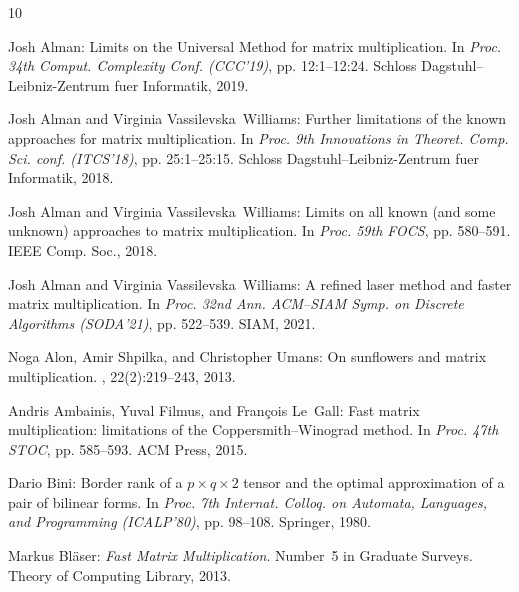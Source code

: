 \documentclass[11pt]{article}
\numberwithin{equation}{section}
\theoremstyle{definition}
\theoremstyle{plain}
\theoremstyle{definition}
\begin{document}
\tocrefpdfbookmark
\begin{thebibliography}{10}

{\sc Josh Alman}: Limits on the {U}niversal {M}ethod for matrix multiplication.
\newblock In {\em Proc. 34th Comput. Complexity Conf. (CCC'19)}, pp.
  12:1--12:24. Schloss Dagstuhl--Leibniz-Zentrum fuer Informatik, 2019.

{\sc Josh Alman and Virginia Vassilevska~Williams}: Further limitations of the
  known approaches for matrix multiplication.
\newblock In {\em Proc. 9th Innovations in Theoret. Comp. Sci. conf.
  (ITCS'18)}, pp. 25:1--25:15. Schloss Dagstuhl--Leibniz-Zentrum fuer
  Informatik, 2018.

{\sc Josh Alman and Virginia Vassilevska~Williams}: Limits on all known (and
  some unknown) approaches to matrix multiplication.
\newblock In {\em Proc. 59th FOCS}, pp. 580--591. IEEE Comp. Soc., 2018.

{\sc Josh Alman and Virginia Vassilevska~Williams}: A refined laser method and
  faster matrix multiplication.
\newblock In {\em Proc. 32nd Ann. ACM--SIAM Symp. on Discrete Algorithms
  (SODA'21)}, pp. 522--539. SIAM, 2021.
\newblock [\epfmtdoi{10.1137/1.9781611976465.32}]

{\sc Noga Alon, Amir Shpilka, and Christopher Umans}: On sunflowers and matrix
  multiplication.
, 22(2):219--243, 2013.
\newblock [\epfmtdoi{10.1007/s00037-013-0060-1}]

{\sc Andris Ambainis, Yuval Filmus, and Fran{\c{c}}ois Le~Gall}: Fast matrix
  multiplication: limitations of the {C}oppersmith--{W}inograd method.
\newblock In {\em Proc. 47th STOC}, pp. 585--593. ACM Press, 2015.
\newblock [\epfmtdoi{10.1145/2746539.2746554}]

{\sc Dario Bini}: Border rank of a $p\times q \times 2$ tensor and the optimal
  approximation of a pair of bilinear forms.
\newblock In {\em Proc. 7th Internat. Colloq. on Automata, Languages, and
  Programming (ICALP'80)}, pp. 98--108. Springer, 1980.
\newblock [\epfmtdoi{10.1007/3-540-10003-2\_63}]

{\sc Markus Bl{\"a}ser}: {\em Fast Matrix Multiplication}.
\newblock Number~5 in Graduate Surveys. Theory of Computing Library, 2013.


\end{thebibliography}
\end{document}

